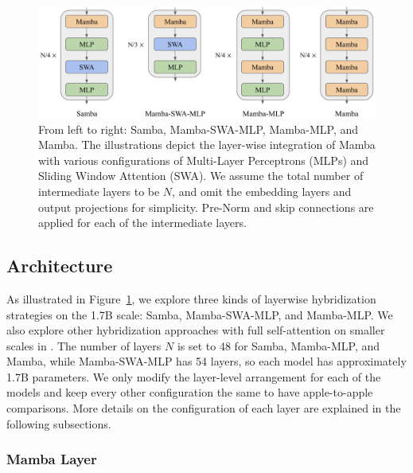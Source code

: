 \documentclass{article}
\begin{document}
\begin{figure}[h]
\includegraphics[width=13.5cm]{Samba.png}
\caption{From left to right: Samba, Mamba-SWA-MLP, Mamba-MLP, and Mamba. The illustrations depict the layer-wise integration of Mamba with various configurations of Multi-Layer Perceptrons (MLPs) and Sliding Window Attention (SWA). We assume the total number of intermediate layers to be $N$, and omit the embedding layers and output projections for simplicity. Pre-Norm \citep{prenorm,rms} and skip connections \citep{resnet} are applied for each of the intermediate layers.
}
\label{smamba}
\vspace{-0.4cm}
\end{figure}

\subsection{Architecture} \label{arch}
As illustrated in Figure~\ref{smamba}, we explore three kinds of layerwise hybridization strategies on the 1.7B scale: Samba, Mamba-SWA-MLP, and Mamba-MLP. We also explore other hybridization approaches with full self-attention on smaller scales in .
The number of layers $N$ is set to 48 for Samba, Mamba-MLP, and Mamba, while Mamba-SWA-MLP has 54 layers, so each model has approximately 1.7B parameters. We only modify the layer-level arrangement for each of the models and keep every other configuration the same to have apple-to-apple comparisons. More details on the configuration of each layer are explained in the following subsections.


\subsubsection{Mamba Layer}
\end{document}
